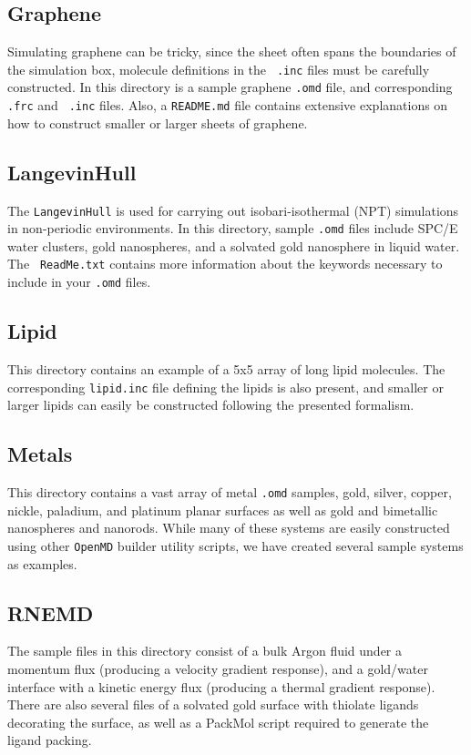 \documentclass[]{book}
\begin{document}
\subsection{Graphene}
Simulating graphene can be tricky, since the sheet often spans the
boundaries of the simulation box, molecule definitions in the {\tt
  .inc} files must be carefully constructed. In this directory is a
sample graphene {\tt .omd} file, and corresponding {\tt .frc} and {\tt
  .inc} files. Also, a {\tt README.md} file contains extensive
explanations on how to construct smaller or larger sheets of
graphene. 

\subsection{LangevinHull}
The {\tt LangevinHull} is used for carrying out isobari-isothermal
(NPT) simulations in non-periodic environments. In this directory,
sample {\tt .omd} files include SPC/E water clusters, gold
nanospheres, and a solvated gold nanosphere in liquid water. The {\tt
  ReadMe.txt} contains more information about the keywords necessary
to include in your {\tt .omd} files.

\subsection{Lipid}
This directory contains an example of a 5x5 array of long lipid
molecules. The corresponding {\tt lipid.inc} file defining the lipids
is also present, and smaller or larger lipids can easily be
constructed following the presented formalism. 

\subsection{Metals}
This directory contains a vast array of metal {\tt.omd} samples, gold,
silver, copper, nickle, paladium, and platinum planar surfaces as well
as gold and bimetallic nanospheres and nanorods. While many of these
systems are easily constructed using other {\tt OpenMD} builder
utility scripts, we have created several sample systems as examples.

\subsection{RNEMD}
The sample files in this directory consist of a bulk Argon fluid under
a momentum flux (producing a velocity gradient response), and a
gold/water interface with a kinetic energy flux (producing a thermal
gradient response). There are also several files of a solvated gold
surface with thiolate ligands decorating the surface, as well as a
PackMol script required to generate the ligand packing.
\end{document}
